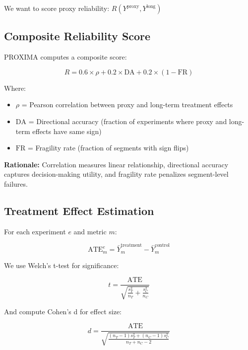 \documentclass[11pt,twocolumn]{article}
\begin{document}
We want to score proxy reliability: $R(Y^{\text{proxy}}, Y^{\text{long}})$

\subsection{Composite Reliability Score}

PROXIMA computes a composite score:

\begin{equation}
R = 0.6 \times \rho + 0.2 \times \text{DA} + 0.2 \times (1 - \text{FR})
\label{eq:composite}
\end{equation}

Where:
\begin{itemize}
    \item $\rho$ = Pearson correlation between proxy and long-term treatment effects
    \item $\text{DA}$ = Directional accuracy (fraction of experiments where proxy and long-term effects have same sign)
    \item $\text{FR}$ = Fragility rate (fraction of segments with sign flips)
\end{itemize}

\textbf{Rationale:} Correlation measures linear relationship, directional accuracy captures decision-making utility, and fragility rate penalizes segment-level failures.

\subsection{Treatment Effect Estimation}

For each experiment $e$ and metric $m$:

\begin{equation}
\text{ATE}_m^e = \bar{Y}_m^{\text{treatment}} - \bar{Y}_m^{\text{control}}
\label{eq:ate}
\end{equation}

We use Welch's t-test for significance:

\begin{equation}
t = \frac{\text{ATE}}{\sqrt{\frac{s_T^2}{n_T} + \frac{s_C^2}{n_C}}}
\label{eq:welch}
\end{equation}

And compute Cohen's d for effect size:

\begin{equation}
d = \frac{\text{ATE}}{\sqrt{\frac{(n_T-1)s_T^2 + (n_C-1)s_C^2}{n_T + n_C - 2}}}
\label{eq:cohend}
\end{equation}
\end{document}
